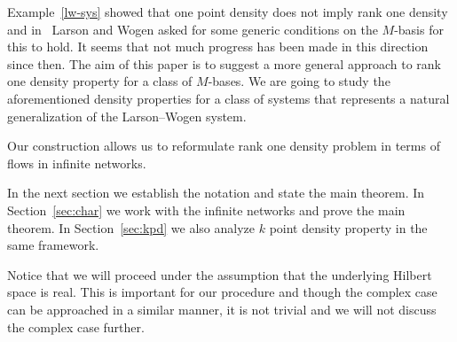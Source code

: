 \documentclass[12pt,oneside,a4paper]{amsart}
\begin{document}
  Example~\ref{lw-sys} showed that one point density does not imply rank one density and
    in~\cite{larson} Larson and Wogen asked for some generic conditions on the $M$-basis
    for this to hold.
  It seems that not much progress has been made in this direction since then.
  The aim of this paper is to suggest a more general approach to rank one density property
    for a class of $M$-bases.
  We are going to study the aforementioned density properties for a class of systems that represents a natural generalization of the Larson--Wogen system.

  Our construction allows us to reformulate rank one density problem in terms of flows in infinite networks.

  In the next section we establish the notation and state the main theorem.
  In Section~\ref{sec:char} we work with the infinite networks and prove the main theorem.
  In Section~\ref{sec:kpd} we also analyze $k$ point density property in the same framework.

  Notice that we will proceed under the assumption that the underlying Hilbert space is real.
  This is important for our procedure and though the complex case can be approached in
    a similar manner, it is not trivial and we will not discuss the complex case further.
\bigskip
\end{document}
